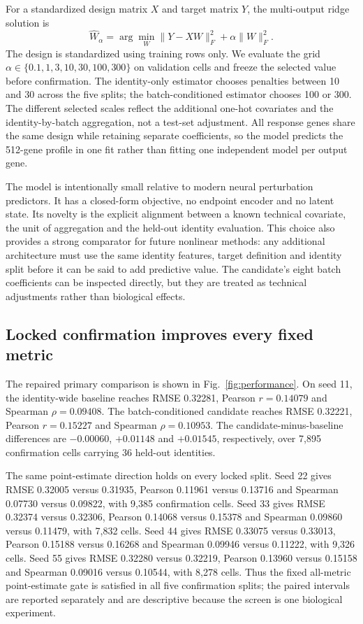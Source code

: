 \documentclass[10pt]{article}
\begin{document}
For a standardized design matrix $X$ and target matrix $Y$, the multi-output ridge solution is
\begin{equation}
 \widehat{W}_{\alpha}=\arg\min_W\|Y-XW\|_F^2+\alpha\|W\|_F^2.
\end{equation}
The design is standardized using training rows only. We evaluate the grid $\alpha\in\{0.1,1,3,10,30,100,300\}$ on validation cells and freeze the selected value before confirmation. The identity-only estimator chooses penalties between 10 and 30 across the five splits; the batch-conditioned estimator chooses 100 or 300. The different selected scales reflect the additional one-hot covariates and the identity-by-batch aggregation, not a test-set adjustment. All response genes share the same design while retaining separate coefficients, so the model predicts the 512-gene profile in one fit rather than fitting one independent model per output gene.

The model is intentionally small relative to modern neural perturbation predictors. It has a closed-form objective, no endpoint encoder and no latent state. Its novelty is the explicit alignment between a known technical covariate, the unit of aggregation and the held-out identity evaluation. This choice also provides a strong comparator for future nonlinear methods: any additional architecture must use the same identity features, target definition and identity split before it can be said to add predictive value. The candidate's eight batch coefficients can be inspected directly, but they are treated as technical adjustments rather than biological effects.

\subsection{Locked confirmation improves every fixed metric}
The repaired primary comparison is shown in Fig.~\ref{fig:performance}. On seed 11, the identity-wide baseline reaches RMSE 0.32281, Pearson $r=0.14079$ and Spearman $\rho=0.09408$. The batch-conditioned candidate reaches RMSE 0.32221, Pearson $r=0.15227$ and Spearman $\rho=0.10953$. The candidate-minus-baseline differences are $-0.00060$, $+0.01148$ and $+0.01545$, respectively, over 7,895 confirmation cells carrying 36 held-out identities.

The same point-estimate direction holds on every locked split. Seed 22 gives RMSE 0.32005 versus 0.31935, Pearson 0.11961 versus 0.13716 and Spearman 0.07730 versus 0.09822, with 9,385 confirmation cells. Seed 33 gives RMSE 0.32374 versus 0.32306, Pearson 0.14068 versus 0.15378 and Spearman 0.09860 versus 0.11479, with 7,832 cells. Seed 44 gives RMSE 0.33075 versus 0.33013, Pearson 0.15188 versus 0.16268 and Spearman 0.09946 versus 0.11222, with 9,326 cells. Seed 55 gives RMSE 0.32280 versus 0.32219, Pearson 0.13960 versus 0.15158 and Spearman 0.09016 versus 0.10544, with 8,278 cells. Thus the fixed all-metric point-estimate gate is satisfied in all five confirmation splits; the paired intervals are reported separately and are descriptive because the screen is one biological experiment.
\end{document}
